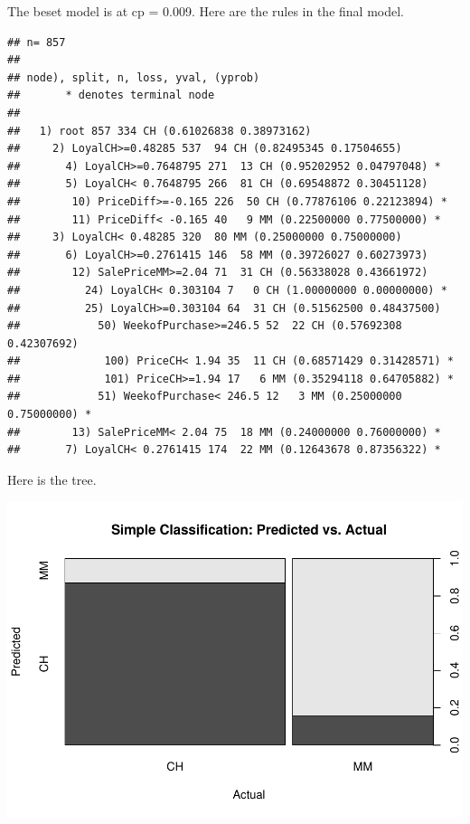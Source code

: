 \documentclass[]{book}
\newenvironment{Shaded}{\begin{snugshade}}{\end{snugshade}}
\newcommand{\DecValTok}[1]{\textcolor[rgb]{0.00,0.00,0.81}{#1}}
\newcommand{\KeywordTok}[1]{\textcolor[rgb]{0.13,0.29,0.53}{\textbf{#1}}}
\newcommand{\NormalTok}[1]{#1}
\newcommand{\OperatorTok}[1]{\textcolor[rgb]{0.81,0.36,0.00}{\textbf{#1}}}
\begin{document}
The beset model is at cp = 0.009. Here are the rules in the final model.

\begin{Shaded}
\end{Shaded}

\begin{verbatim}
## n= 857 
## 
## node), split, n, loss, yval, (yprob)
##       * denotes terminal node
## 
##   1) root 857 334 CH (0.61026838 0.38973162)  
##     2) LoyalCH>=0.48285 537  94 CH (0.82495345 0.17504655)  
##       4) LoyalCH>=0.7648795 271  13 CH (0.95202952 0.04797048) *
##       5) LoyalCH< 0.7648795 266  81 CH (0.69548872 0.30451128)  
##        10) PriceDiff>=-0.165 226  50 CH (0.77876106 0.22123894) *
##        11) PriceDiff< -0.165 40   9 MM (0.22500000 0.77500000) *
##     3) LoyalCH< 0.48285 320  80 MM (0.25000000 0.75000000)  
##       6) LoyalCH>=0.2761415 146  58 MM (0.39726027 0.60273973)  
##        12) SalePriceMM>=2.04 71  31 CH (0.56338028 0.43661972)  
##          24) LoyalCH< 0.303104 7   0 CH (1.00000000 0.00000000) *
##          25) LoyalCH>=0.303104 64  31 CH (0.51562500 0.48437500)  
##            50) WeekofPurchase>=246.5 52  22 CH (0.57692308 0.42307692)  
##             100) PriceCH< 1.94 35  11 CH (0.68571429 0.31428571) *
##             101) PriceCH>=1.94 17   6 MM (0.35294118 0.64705882) *
##            51) WeekofPurchase< 246.5 12   3 MM (0.25000000 0.75000000) *
##        13) SalePriceMM< 2.04 75  18 MM (0.24000000 0.76000000) *
##       7) LoyalCH< 0.2761415 174  22 MM (0.12643678 0.87356322) *
\end{verbatim}

Here is the tree.

\begin{Shaded}
\end{Shaded}

\includegraphics{data-sci_files/figure-latex/unnamed-chunk-51-1.pdf}
\end{document}
